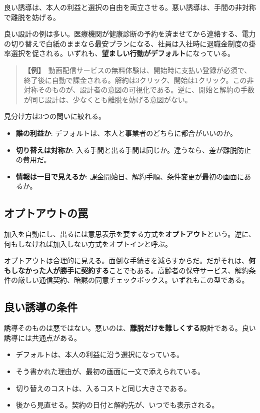 \documentclass{article}
\begin{document}
良い誘導は、本人の利益と選択の自由を両立させる。悪い誘導は、手間の非対称で離脱を妨げる。

良い設計の例は多い。医療機関が健康診断の予約を済ませてから連絡する、電力の切り替えで白紙のままなら最安プランになる、社員は入社時に退職金制度の掛率選択を促される。いずれも、\textbf{望ましい行動がデフォルト}になっている。

\begin{quote}
\textbf{【例】}\ 動画配信サービスの無料体験は、開始時に支払い登録が必須で、終了後に自動で課金される。解約は3クリック、開始は1クリック。この非対称そのものが、設計者の意図の可視化である。逆に、開始と解約の手数が同じ設計は、少なくとも離脱を妨げる意図がない。
\end{quote}

見分け方は3つの問いに絞れる。

\begin{itemize}
\item \textbf{誰の利益か}: デフォルトは、本人と事業者のどちらに都合がいいのか。
\item \textbf{切り替えは対称か}: 入る手間と出る手間は同じか。違うなら、差が離脱防止の費用だ。
\item \textbf{情報は一目で見えるか}: 課金開始日、解約手順、条件変更が最初の画面にあるか。
\end{itemize}

\subsection{オプトアウトの罠}

加入を自動にし、出るには意思表示を要する方式を\textbf{オプトアウト}という。逆に、何もしなければ加入しない方式をオプトインと呼ぶ。

オプトアウトは合理的に見える。面倒な手続きを減らすからだ。だがそれは、\textbf{何もしなかった人が勝手に契約する}ことでもある。高齢者の保守サービス、解約条件の厳しい通信契約、暗黙の同意チェックボックス。いずれもこの型である。

\subsection{良い誘導の条件}

誘導そのものは悪ではない。悪いのは、\textbf{離脱だけを難しくする}設計である。良い誘導には共通点がある。

\begin{itemize}
\item デフォルトは、本人の利益に沿う選択になっている。
\item そう書かれた理由が、最初の画面に一文で添えられている。
\item 切り替えのコストは、入るコストと同じ大きさである。
\item 後から見直せる。契約の日付と解約先が、いつでも表示される。
\end{itemize}
\end{document}

